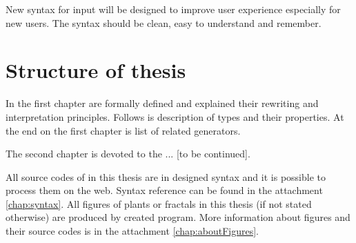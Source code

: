 New syntax for input will be designed to improve user experience especially for new users.
The syntax should be clean, easy to understand and remember.


\section*{Structure of thesis}

In the first chapter \lsystems are formally defined and explained their rewriting and interpretation principles.
Follows is description of \lsystem types and their properties.
At the end on the first chapter is list of related \lsystem generators.

The second chapter is devoted to the ... [to be continued].

All source codes of \lsystems in this thesis are in designed syntax and it is possible to process them on the web.
Syntax reference can be found in the attachment \ref{chap:syntax}.
All figures of plants or fractals in this thesis (if not stated otherwise) are produced by created program.
More information about figures and their source codes is in the attachment \ref{chap:aboutFigures}.































